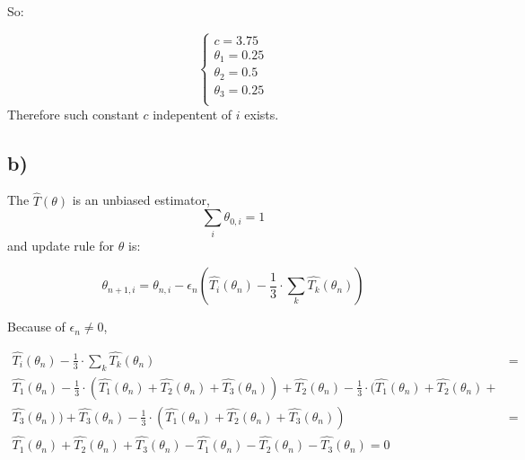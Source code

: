 \documentclass{article}
\begin{document}
So: 

$$
\begin{cases} 
c = 3.75 \\ 
\theta_{1} = 0.25 \\ 
\theta_{2} = 0.5 \\
\theta_{3} = 0.25 \\
\end{cases}
$$
Therefore such constant $c$ indepentent of $i$ exists. 

\subsection{b)}

The $\hat{T}(\theta)$ is an unbiased estimator, $$\sum_{i}\theta_{0,i}=1$$ and update rule for $\theta$ is:

$$\theta_{n+1, i} = \theta_{n,i} - \epsilon_{n}( \hat{T_{i}}(\theta_{n}) - \frac{1}{3}\cdot\sum_{k}\hat{T_{k}}(\theta_n))$$

Because of $\epsilon_{n}\neq 0$,

\begin{eqnarray*}
\hat{T_{i}}(\theta_{n}) - \frac{1}{3}\cdot\sum_{k}\hat{T_{k}}(\theta_n) &=& \\ \hat{T_{1}}(\theta_{n}) - \frac{1}{3}\cdot(\hat{T_{1}}(\theta_{n}) + \hat{T_{2}}(\theta_{n}) + \hat{T_{3}}(\theta_{n})) + \hat{T_{2}}(\theta_{n}) - \frac{1}{3}\cdot(\hat{T_{1}}(\theta_{n}) + \hat{T_{2}}(\theta_{n}) + \\ \hat{T_{3}}(\theta_{n})) + \hat{T_{3}}(\theta_{n}) - \frac{1}{3}\cdot(\hat{T_{1}}(\theta_{n}) + \hat{T_{2}}(\theta_{n}) + \hat{T_{3}}(\theta_{n})) &=&\\ \hat{T_{1}}(\theta_{n}) + \hat{T_{2}}(\theta_{n}) + \hat{T_{3}}(\theta_{n}) - \hat{T_{1}}(\theta_{n}) - \hat{T_{2}}(\theta_{n}) - \hat{T_{3}}(\theta_{n}) = 0
\end{eqnarray*}

\end{document}
